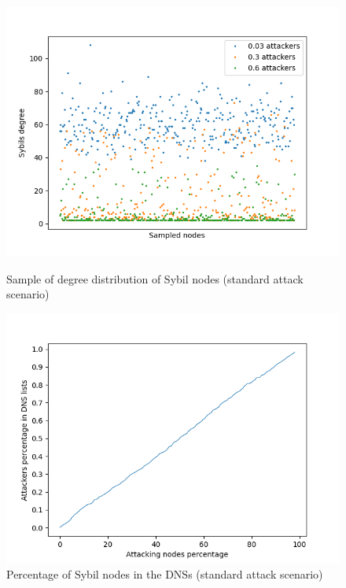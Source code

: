     \begin{figure}[ht]
        \begin{minipage}[b]{0.5\linewidth}
            \includegraphics[width=1.1\textwidth]{pict/results/in-cluster.png}
			\centering
			\caption{Sample of degree distribution of Sybil nodes (standard attack scenario)}
			\label{fig:incluster}
        \end{minipage}
        \hspace{0.5cm}
        \begin{minipage}[b]{0.5\linewidth}
			\includegraphics[width=1.1\textwidth]{pict/results/in-dns.png}
			\centering
			\caption{Percentage of Sybil nodes in the DNSs (standard attack scenario)}
			\label{fig:dns}
        \end{minipage}
    \end{figure}

